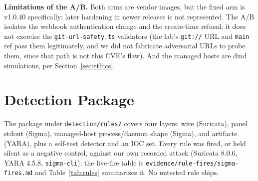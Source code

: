 \documentclass[journal]{IEEEtran}
\begin{document}
\textbf{Limitations of the A/B.} Both arms are vendor images, but the
fixed arm is v1.0.40 specifically: later hardening in newer releases is not
represented. The A/B isolates the webhook authentication change and the
create-time refusal; it does not exercise the \texttt{git-url-safety.ts}
validators (the lab's \texttt{git://} URL and \texttt{main} ref pass them
legitimately, and we did not fabricate adversarial URLs to probe them, since
that path is not this CVE's flaw). And the managed hosts are dind
simulations, per Section~\ref{sec:ethics}.

\section{Detection Package}
\label{sec:detection}

The package under \texttt{detection/rules/} covers four layers:
wire (Suricata), panel stdout (Sigma), managed-host process/daemon shape
(Sigma), and artifacts (YARA), plus a self-test detector and an IOC set. Every
rule was fired, or held silent as a negative control, against our own recorded
attack (Suricata 8.0.6, YARA 4.5.8, \texttt{sigma-cli}); the live-fire table is
\texttt{evidence/}\allowbreak\texttt{rule-fires/}\allowbreak\texttt{sigma-fires.md}
and Table~\ref{tab:rules} summarizes it. No untested rule ships.
\end{document}
